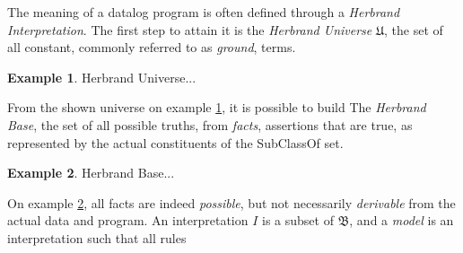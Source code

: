 \documentclass[sigconf,screen,review,natbib]{acmart}
\theoremstyle{definition}
\newtheorem{exmp}{Example}[section]
\begin{document}
The meaning of a datalog program is often\cite{datalog} defined through a \textit{Herbrand Interpretation}. The first step
to attain it is the \textit{Herbrand Universe} $\mathfrak{U}$, the set of all constant, commonly referred to as \textit{ground}, terms.
\begin{exmp}{Herbrand Universe}\label{ex2}
	...
\end{exmp}
From the shown universe on example \ref{ex2}, it is possible to build The \textit{Herbrand Base}, the set of all possible truths,
from \textit{facts}, assertions that are true, as represented by the actual constituents of the SubClassOf set.
\begin{exmp}{Herbrand Base}\label{ex3}
	...
\end{exmp}
On example \ref{ex3}, all facts are indeed \textit{possible}, but not necessarily \textit{derivable} from the actual data and
program. An interpretation $I$ is a subset of $\mathfrak{B}$, and a \textit{model} is an interpretation such that all rules
\end{document}
